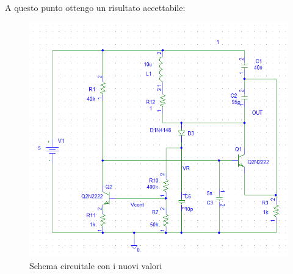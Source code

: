 \documentclass{article}
\begin{document}
A questo punto ottengo un risultato accettabile:
~\begin{figure}[H]
\includegraphics[width=\textwidth]{NuovoSchema.png}
\centering
\caption{Schema circuitale con i nuovi valori}
\label{fig:foo}
\end{figure}
\end{document}
